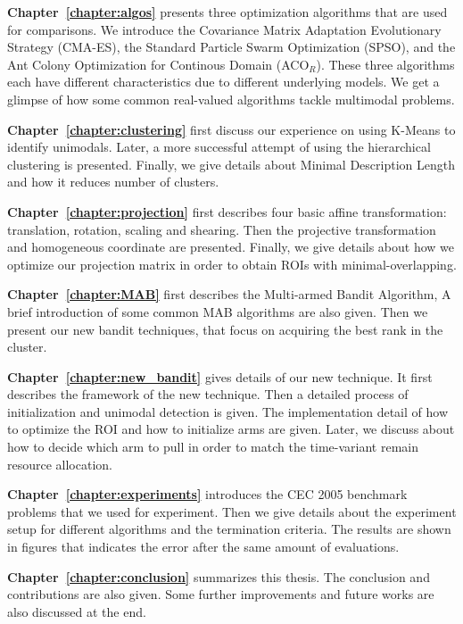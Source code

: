 \textbf{Chapter~\ref{chapter:algos}} presents three optimization algorithms that are used for comparisons.
We introduce 
the Covariance Matrix Adaptation Evolutionary Strategy (CMA-ES),
the Standard Particle Swarm Optimization (SPSO), and
the Ant Colony Optimization for Continous Domain (ACO$_R$).
These three algorithms each have different characteristics due to different underlying models.
We get a glimpse of how some common real-valued algorithms tackle multimodal problems. 


\textbf{Chapter~\ref{chapter:clustering}} first discuss our experience on using K-Means to identify unimodals.
Later, a more successful attempt of using the hierarchical clustering is presented.
Finally, we give details about Minimal Description Length and how it reduces number of clusters.

\textbf{Chapter~\ref{chapter:projection}} first describes four basic affine transformation: translation, rotation, scaling and shearing.
Then the projective transformation and homogeneous coordinate are presented.
Finally, we give details about how we optimize our projection matrix in order to obtain ROIs with minimal-overlapping.


\textbf{Chapter~\ref{chapter:MAB}} first describes the Multi-armed Bandit Algorithm, 
A brief introduction of some common MAB algorithms are also given.
Then we present our new bandit techniques, that focus on acquiring the best rank in the cluster.


\textbf{Chapter~\ref{chapter:new_bandit}} gives details of our new technique.
It first describes the framework of the new technique.
Then a detailed process of initialization and unimodal detection is given.
The implementation detail of how to optimize the ROI and how to initialize arms are given.
Later, we discuss about how to decide which arm to pull in order to match the time-variant remain resource allocation.

\textbf{Chapter~\ref{chapter:experiments}} introduces the CEC 2005 benchmark problems that we used for experiment.
Then we give details about the experiment setup for different algorithms and the termination criteria.
The results are shown in figures that indicates the error after the same amount of evaluations.

\textbf{Chapter~\ref{chapter:conclusion}} summarizes this thesis. 
The conclusion and contributions are also given.
Some further improvements and future works are also discussed at the end.


